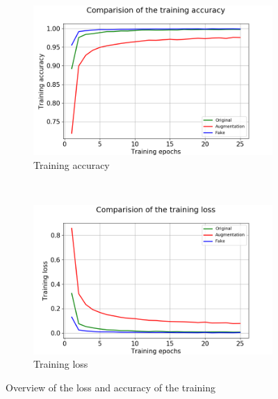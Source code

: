 \documentclass[13pt]{article}
\begin{document}
\begin{figure}[h!]
    \centering
    \begin{subfigure}[b]{0.48\textwidth}
        \includegraphics[width=\textwidth]{plots/mnist/comparision_acc.png}
        \caption{Training accuracy}
    \end{subfigure}
    ~ 
    \begin{subfigure}[b]{0.48\textwidth}
        \includegraphics[width=\textwidth]{plots/mnist/comparision_loss.png}
        \caption{Training loss}
    \end{subfigure}
    \caption{Overview of the loss and accuracy of the training}
    \label{fig:mnist_training}
\end{figure}
\end{document}
